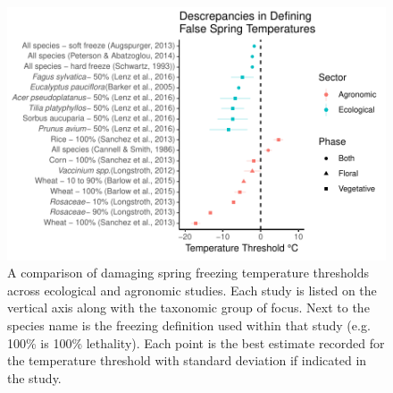 \documentclass{article}\usepackage[]{graphicx}\usepackage[]{color}
\makeatletter
\def\maxwidth{ %
  \ifdim\Gin@nat@width>\linewidth
    \linewidth
  \else
    \Gin@nat@width
  \fi
}
\makeatother
\begin{document}
\begin{figure}[H]

{\centering \includegraphics[width=\maxwidth]{figure/temp-1} 

}

\caption[A comparison of damaging spring freezing temperature thresholds across ecological and agronomic studies]{A comparison of damaging spring freezing temperature thresholds across ecological and agronomic studies. Each study is listed on the vertical axis along with the taxonomic group of focus. Next to the species name is the freezing definition used within that study (e.g. 100\% is 100\% lethality). Each point is the best estimate recorded for the temperature threshold with standard deviation if indicated in the study.}\label{fig:temp}
\end{figure}
\end{document}
